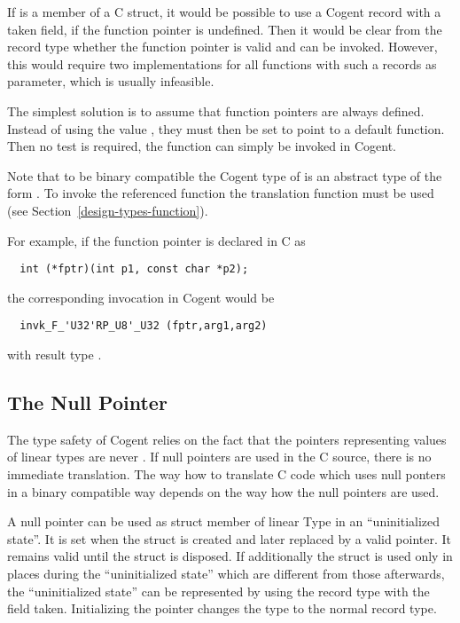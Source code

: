 If  is a member of a C struct, it would be possible to use a Cogent record with a taken field,
if the function pointer is undefined. Then it would be clear from the record type whether the function pointer
is valid and can be invoked. However, this would require two implementations for all functions with such a records 
as parameter, which is usually infeasible.

The simplest solution is to assume that function pointers are always defined. Instead of using the value 
, they must then be set to point to a default function. Then no test is required, the function
can simply be invoked in Cogent.

Note that to be binary compatible the Cogent type of  is an abstract type of the form .
To invoke the referenced function the translation function  must be used (see 
Section~\ref{design-types-function}). 

For example, if the function pointer is declared in C as 
\begin{verbatim}
  int (*fptr)(int p1, const char *p2);
\end{verbatim}
the corresponding invocation in Cogent would be
\begin{verbatim}
  invk_F_'U32'RP_U8'_U32 (fptr,arg1,arg2)
\end{verbatim}
with result type .

\subsection{The Null Pointer}
\label{app-trans-null}

The type safety of Cogent relies on the fact that the pointers representing values of linear types are never .
If null pointers are used in the C source, there is no immediate translation. The way how to translate C code which uses 
null ponters in a binary compatible way depends on the way how the null pointers are used.

A null pointer can be used as struct member  of linear Type  in an ``uninitialized state''. 
It is set when the struct is created and later
replaced by a valid pointer. It remains valid until the struct is disposed. If additionally the struct is used only in places
during the ``uninitialized state'' which are different from those afterwards, the ``uninitialized state'' can be represented
by using the record type with the field  taken. Initializing the pointer changes the type to the normal record
type.

